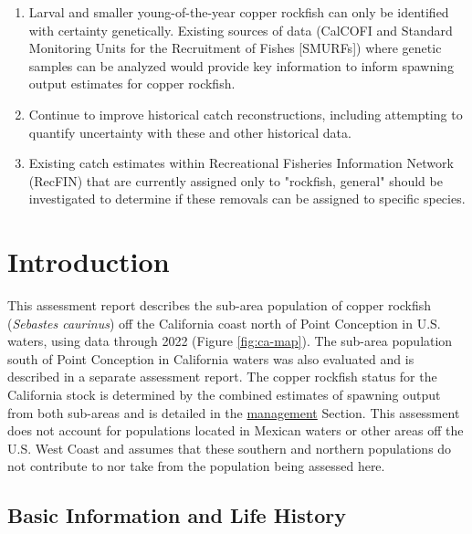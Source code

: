 \documentclass[11pt,
  letterpaper,
]{article}
\begin{document}
\begin{enumerate}
    \item Larval and smaller young-of-the-year copper rockfish can only be identified with certainty genetically. Existing sources of data (CalCOFI and Standard Monitoring Units for the Recruitment of Fishes [SMURFs]) where genetic samples can be analyzed would provide key information to inform spawning output estimates for copper rockfish.
 
    \item Continue to improve historical catch reconstructions, including attempting to quantify uncertainty with these and other historical data.
  
    \item Existing catch estimates within Recreational Fisheries Information Network (RecFIN) that are currently assigned only to "rockfish, general" should be investigated to determine if these removals can be assigned to specific species.

\end{enumerate}

\pagebreak
\setlength{\parskip}{5mm plus1mm minus1mm}
\setcounter{page}{1}
\renewcommand{\thefigure}{\arabic{figure}}
\renewcommand{\thetable}{\arabic{table}}
\setcounter{table}{0}
\setcounter{figure}{0}

\section{Introduction}\label{introduction}

This assessment report describes the sub-area population of copper rockfish (\emph{Sebastes caurinus}) off the California coast north of Point Conception in U.S. waters, using data through 2022 (Figure \ref{fig:ca-map}). The sub-area population south of Point Conception in California waters was also evaluated and is described in a separate assessment report. The copper rockfish status for the California stock is determined by the combined estimates of spawning output from both sub-areas and is detailed in the \hyperref[management]{management} Section. This assessment does not account for populations located in Mexican waters or other areas off the U.S. West Coast and assumes that these southern and northern populations do not contribute to nor take from the population being assessed here.

\subsection{Basic Information and Life History}\label{basic-information-and-life-history}
\end{document}
